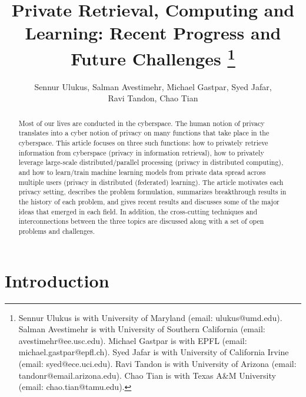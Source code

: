 \documentclass[12pt,draftcls,onecolumn]{IEEEtran}
\begin{document}
\title{Private Retrieval, Computing and Learning: Recent Progress and Future Challenges \footnote{Sennur Ulukus is with University of Maryland (email: ulukus@umd.edu). Salman Avestimehr is with University of Southern California (email: avestimehr@ee.usc.edu). Michael Gastpar is with EPFL (email: michael.gastpar@epfl.ch). Syed Jafar is with University of California Irvine (email: syed@ece.uci.edu). Ravi Tandon is with University of Arizona (email: tandonr@email.arizona.edu). Chao Tian is with Texas A\&M University (email: chao.tian@tamu.edu).}}
\author{Sennur Ulukus, Salman Avestimehr, Michael Gastpar, Syed Jafar, \\ \vspace*{-0.4cm} Ravi Tandon, Chao Tian}

\maketitle

\vspace*{-1cm}

\begin{abstract}
Most of our lives are conducted in the cyberspace. The human notion of privacy translates into a cyber notion of privacy on many functions that take place in the cyberspace. This article focuses on three such functions: how to privately retrieve information from cyberspace (privacy in information retrieval), how to privately leverage large-scale distributed/parallel processing (privacy in distributed computing), and how to learn/train machine learning models from private data spread across multiple users (privacy in distributed (federated) learning). The article motivates each privacy setting, describes the problem formulation, summarizes breakthrough results in the history of each problem, and gives recent results and discusses some of the major ideas that emerged in each field. In addition, the cross-cutting techniques and interconnections between the three topics are discussed along with a set of open problems and challenges. 
\end{abstract}

\section{Introduction} \label{sect:intro}
\end{document}
